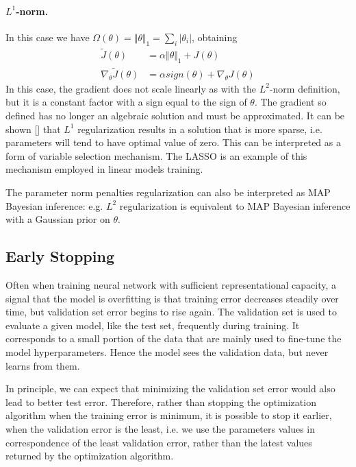 \paragraph{$L^1$-norm.} In this case we have $\Omega(\theta) = \Vert \theta \Vert_{1} = \sum_{i}|\theta_i|$, obtaining
\begin{align*}
    \tilde{J}(\theta) &= \alpha \Vert \theta \Vert_{1} + J(\theta)\\
    \nabla_{\theta} \tilde{J}(\theta) &= \alpha sign(\theta) + \nabla_{\theta} J(\theta)
\end{align*}
In this case, the gradient does not scale linearly as with the $L^2$-norm definition, but it is a constant factor with a sign equal to the sign of $\theta$. The gradient so defined has no longer an algebraic solution and must be approximated. It can be shown [\cite{Goodfellow-et-al-2016}] that $L^1$ regularization results in a solution that is more sparse, i.e. parameters will tend to have optimal value of zero. This can be interpreted as a form of variable selection mechanism. The LASSO is an example of this mechanism employed in linear models training. 

The parameter norm penalties regularization can also be interpreted as MAP Bayesian inference: e.g. $L^2$ regularization is equivalent to MAP Bayesian inference with a Gaussian prior on $\theta$.




\subsection{Early Stopping}\label{subsec:early_stopping}
Often when training neural network with sufficient representational capacity, a signal that the model is overfitting is that training error decreases steadily over time, but validation set error begins to rise again. The validation set is used to evaluate a given model, like the test set, frequently during training. It corresponds to a small portion of the data that are mainly used to fine-tune the model hyperparameters. Hence the model  sees the validation data, but never learns from them.

In principle, we can expect that minimizing the validation set error would also lead to better test error. Therefore, rather than stopping the optimization algorithm when the training error is minimum, it is possible to stop it earlier, when the validation error is the least, i.e. we use the parameters values in correspondence of the least validation error, rather than the latest values returned by the optimization algorithm. 

